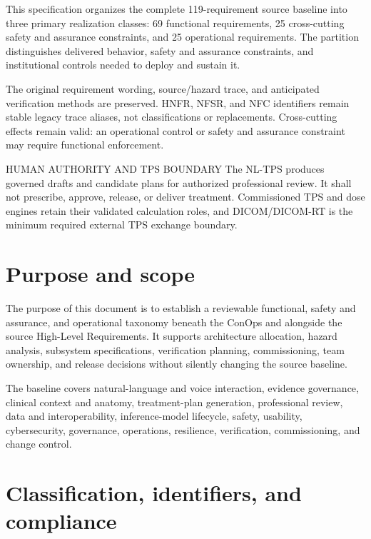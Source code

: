 \documentclass[11pt,letterpaper]{article}
\begin{document}

This specification organizes the complete 119-requirement source baseline into three primary realization classes: 69 functional requirements, 25 cross-cutting safety and assurance constraints, and 25 operational requirements. The partition distinguishes delivered behavior, safety and assurance constraints, and institutional controls needed to deploy and sustain it.

The original requirement wording, source/hazard trace, and anticipated verification methods are preserved. HNFR, NFSR, and NFC identifiers remain stable legacy trace aliases, not classifications or replacements. Cross-cutting effects remain valid: an operational control or safety and assurance constraint may require functional enforcement.

\begin{nlnotice}{HUMAN AUTHORITY AND TPS BOUNDARY}
The NL-TPS produces governed drafts and candidate plans for authorized professional review. It shall not prescribe, approve, release, or deliver treatment. Commissioned TPS and dose engines retain their validated calculation roles, and DICOM/DICOM-RT is the minimum required external TPS exchange boundary.
\end{nlnotice}

\section{Purpose and scope}

The purpose of this document is to establish a reviewable functional, safety and assurance, and operational taxonomy beneath the ConOps and alongside the source High-Level Requirements. It supports architecture allocation, hazard analysis, subsystem specifications, verification planning, commissioning, team ownership, and release decisions without silently changing the source baseline.

The baseline covers natural-language and voice interaction, evidence governance, clinical context and anatomy, treatment-plan generation, professional review, data and interoperability, inference-model lifecycle, safety, usability, cybersecurity, governance, operations, resilience, verification, commissioning, and change control.

\section{Classification, identifiers, and compliance}
\end{document}
